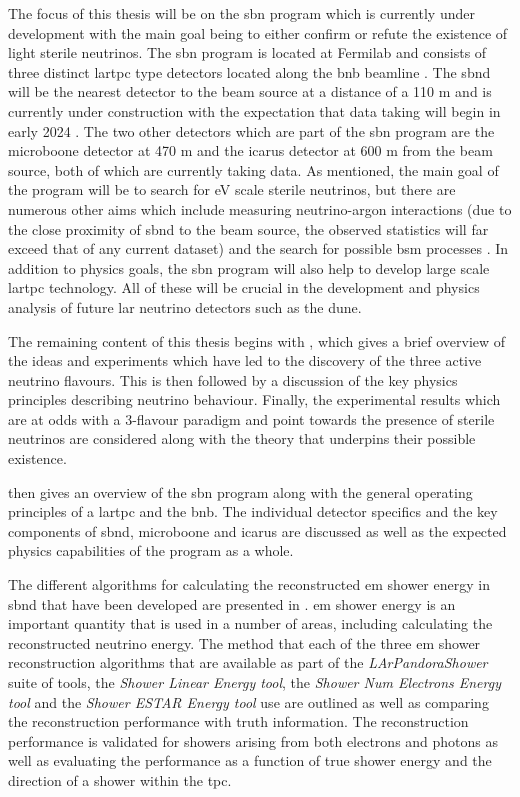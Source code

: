 The focus of this thesis will be on the \gls{sbn} program which is currently under development with the main goal being to either confirm or refute the existence of light sterile neutrinos. The \gls{sbn} program is located at Fermilab and consists of three distinct \gls{lartpc} type detectors located along the \gls{bnb} beamline \cite{SBN_Proposal}. The \gls{sbnd} will be the nearest detector to the beam source at a distance of a 110 m and is currently under construction with the expectation that data taking will begin in early 2024 \cite{sbnd_timeline}. The two other detectors which are part of the \gls{sbn} program are the \gls{microboone} detector at 470 m and the \gls{icarus} detector at 600 m from the beam source, both of which are currently taking data. As mentioned, the main goal of the program will be to search for eV scale sterile neutrinos, but there are numerous other aims which include measuring neutrino-argon interactions (due to the close proximity of \gls{sbnd} to the beam source, the observed statistics will far exceed that of any current dataset) and the search for possible \gls{bsm} processes \cite{SBN_paper}. In addition to physics goals, the \gls{sbn} program will also help to develop large scale \gls{lartpc} technology. All of these will be crucial in the development and physics analysis of future \gls{lar} neutrino detectors such as the \gls{dune}. 

The remaining content of this thesis begins with , which gives a brief overview of the ideas and experiments which have led to the discovery of the three active neutrino flavours. This is then followed by a discussion of the key physics principles describing neutrino behaviour. Finally, the experimental results which are at odds with a 3-flavour paradigm and point towards the presence of sterile neutrinos are considered along with the theory that underpins their possible existence. 

 then gives an overview of the \gls{sbn} program along with the general operating principles of a \gls{lartpc} and the \gls{bnb}. The individual detector specifics and the key components of \gls{sbnd}, \gls{microboone} and \gls{icarus} are discussed as well as the expected physics capabilities of the program as a whole. 

The different algorithms for calculating the reconstructed \gls{em} shower energy in \gls{sbnd} that have been developed are presented in . \gls{em} shower energy is an important quantity that is used in a number of areas, including calculating the reconstructed neutrino energy. The method that each of the three \gls{em} shower reconstruction algorithms that are available as part of the \textit{LArPandoraShower} suite of tools, the \textit{Shower Linear Energy tool}, the \textit{Shower Num Electrons Energy tool} and the \textit{Shower ESTAR Energy tool} use are outlined as well as comparing the reconstruction performance with truth information. The reconstruction performance is validated for showers arising from both electrons and photons as well as evaluating the performance as a function of true shower energy and the direction of a shower within the \gls{tpc}. 

